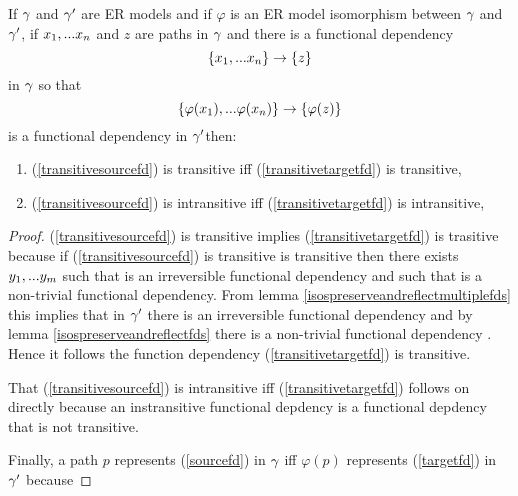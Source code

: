 \begin{lemma}
If $\gamma$ and $\gamma'$ are ER models and  if  $\varphi$ is an ER model isomorphism between $\gamma$  and $\gamma'$,  if $x_1,...x_n$ and $z$ are paths in $\gamma$
and there is a  functional dependency
\begin{equation}
\label{transitivesourcefd}
\left\{x_1,...x_n\right\} \rightarrow \left\{z\right\}
\end{equation} 
in $\gamma$
so that
\begin{equation}
\label{transitivetargetfd}
\left\{\varphi(x_1),...\varphi(x_n)\right\} \rightarrow \left\{\varphi(z)\right\}
\end{equation}
is a functional dependency in $\gamma'$then:
\begin{enumerate}
\item (\ref{transitivesourcefd}) is  transitive iff (\ref{transitivetargetfd}) is transitive, 
\item (\ref{transitivesourcefd}) is  intransitive iff (\ref{transitivetargetfd}) is intransitive,

\end{enumerate}
\end{lemma}
\begin{proof}
\vspace{0.5cm}
(\ref{transitivesourcefd}) is transitive implies (\ref{transitivetargetfd}) 
is trasitive because if (\ref{transitivesourcefd}) is transitive is transitive then
there exists $y_1,...y_m$ such that
\fd{\xn}{\ym} is an irreversible functional dependency
and such that  is a non-trivial functional dependency.
From lemma \ref{isospreserveandreflectmultiplefds} this implies that in $\gamma'$ there is an 
\fd{\phixn}{\phiym} irreversible functional dependency \fd{\phixn}{\phiym}
and by lemma \ref{isospreserveandreflectfds} there is a non-trivial functional dependency \fd{\phiym}{\phiz}. Hence it follows
the function dependency (\ref{transitivetargetfd}) is transitive.

That (\ref{transitivesourcefd}) is  intransitive iff (\ref{transitivetargetfd}) follows on directly because an instransitive functional depdency is a functional depdency that is not transitive.

Finally, a path $p$ represents (\ref{sourcefd}) in $\gamma$ iff $\varphi(p)$ represents (\ref{targetfd}) in $\gamma'$
because

\end{proof}

